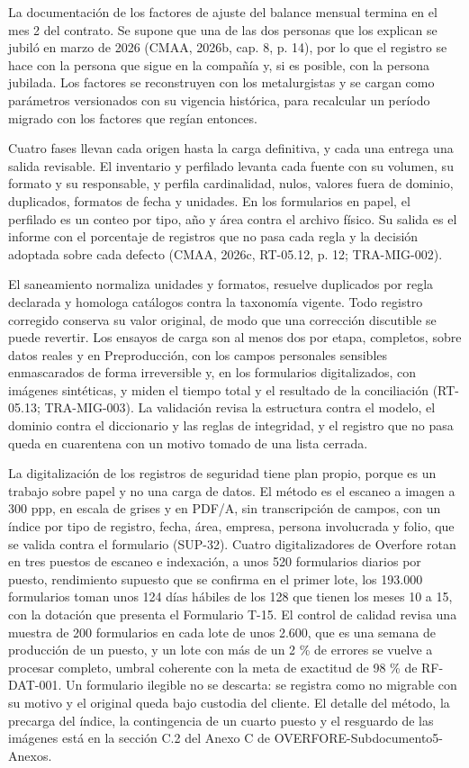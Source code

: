 \documentclass[subdoc]{../../comun/overfore}
\begin{document}
La documentación de los factores de ajuste del balance mensual termina en el mes 2 del contrato. Se supone que una de las dos personas que los explican se jubiló en marzo de 2026 (CMAA, 2026b, cap. 8, p. 14), por lo que el registro se hace con la persona que sigue en la compañía y, si es posible, con la persona jubilada. Los factores se reconstruyen con los metalurgistas y se cargan como parámetros versionados con su vigencia histórica, para recalcular un período migrado con los factores que regían entonces.

Cuatro fases llevan cada origen hasta la carga definitiva, y cada una entrega una salida revisable. El inventario y perfilado levanta cada fuente con su volumen, su formato y su responsable, y perfila cardinalidad, nulos, valores fuera de dominio, duplicados, formatos de fecha y unidades. En los formularios en papel, el perfilado es un conteo por tipo, año y área contra el archivo físico. Su salida es el informe con el porcentaje de registros que no pasa cada regla y la decisión adoptada sobre cada defecto (CMAA, 2026c, RT-05.12, p. 12; TRA-MIG-002).

El saneamiento normaliza unidades y formatos, resuelve duplicados por regla declarada y homologa catálogos contra la taxonomía vigente. Todo registro corregido conserva su valor original, de modo que una corrección discutible se puede revertir. Los ensayos de carga son al menos dos por etapa, completos, sobre datos reales y en Preproducción, con los campos personales sensibles enmascarados de forma irreversible y, en los formularios digitalizados, con imágenes sintéticas, y miden el tiempo total y el resultado de la conciliación (RT-05.13; TRA-MIG-003). La validación revisa la estructura contra el modelo, el dominio contra el diccionario y las reglas de integridad, y el registro que no pasa queda en cuarentena con un motivo tomado de una lista cerrada.

La digitalización de los registros de seguridad tiene plan propio, porque es un trabajo sobre papel y no una carga de datos. El método es el escaneo a imagen a 300 ppp, en escala de grises y en PDF/A, sin transcripción de campos, con un índice por tipo de registro, fecha, área, empresa, persona involucrada y folio, que se valida contra el formulario (SUP-32). Cuatro digitalizadores de Overfore rotan en tres puestos de escaneo e indexación, a unos 520 formularios diarios por puesto, rendimiento supuesto que se confirma en el primer lote, los 193.000 formularios toman unos 124 días hábiles de los 128 que tienen los meses 10 a 15, con la dotación que presenta el Formulario T-15. El control de calidad revisa una muestra de 200 formularios en cada lote de unos 2.600, que es una semana de producción de un puesto, y un lote con más de un 2 \% de errores se vuelve a procesar completo, umbral coherente con la meta de exactitud de 98 \% de RF-DAT-001. Un formulario ilegible no se descarta: se registra como no migrable con su motivo y el original queda bajo custodia del cliente. El detalle del método, la precarga del índice, la contingencia de un cuarto puesto y el resguardo de las imágenes está en la sección C.2 del Anexo C de OVERFORE-Subdocumento5-Anexos.
\end{document}
